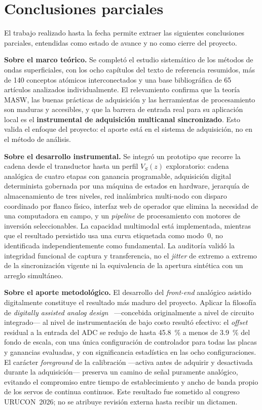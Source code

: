 \section{Conclusiones parciales}
\label{sec:conclusiones}

El trabajo realizado hasta la fecha permite extraer las siguientes conclusiones
parciales, entendidas como estado de avance y no como cierre del proyecto.

\textbf{Sobre el marco te\'orico.} Se complet\'o el estudio sistem\'atico de los m\'etodos de
ondas superficiales, con los ocho cap\'itulos del texto de referencia resumidos, m\'as de
140 conceptos at\'omicos interconectados y una base bibliogr\'afica de 65 art\'iculos
analizados individualmente. El relevamiento confirma que la teor\'ia MASW, las buenas
pr\'acticas de adquisici\'on y las herramientas de procesamiento son maduras y accesibles,
y que la barrera de entrada real para su aplicaci\'on local es el \textbf{instrumental de
adquisici\'on multicanal sincronizado}. Esto valida el enfoque del proyecto: el aporte
est\'a en el sistema de adquisici\'on, no en el m\'etodo de an\'alisis.

\textbf{Sobre el desarrollo instrumental.} Se integr\'o un prototipo que recorre la cadena
desde el transductor hasta un perfil $V_S(z)$ exploratorio: cadena
anal\'ogica de cuatro etapas con ganancia programable, adquisici\'on digital determinista
gobernada por una m\'aquina de estados en hardware, jerarqu\'ia de almacenamiento de tres
niveles, red inal\'ambrica multi-nodo con disparo coordinado por flanco f\'isico,
interfaz web de operador que elimina la necesidad de una computadora en campo, y un
\emph{pipeline} de procesamiento con motores de inversi\'on seleccionables. La capacidad
multimodal est\'a implementada, mientras que el resultado persistido usa una curva
etiquetada como modo~0, no identificada independientemente como fundamental. La
auditor\'ia valid\'o la integridad funcional de captura y transferencia, no el
\emph{jitter} de extremo a extremo de la sincronizaci\'on vigente ni la equivalencia de la
apertura sint\'etica con un arreglo simult\'aneo.

\textbf{Sobre el aporte metodol\'ogico.} El desarrollo del \emph{front-end} anal\'ogico
asistido digitalmente constituye el resultado m\'as maduro del proyecto. Aplicar la
filosof\'ia de \emph{digitally assisted analog design}~\cite{Murmann2004} ---concebida
originalmente a nivel de circuito integrado--- al nivel de instrumentaci\'on de bajo costo
result\'o efectivo: el \emph{offset} residual a la entrada del ADC se redujo de hasta
\SI{45.8}{\percent} a menos de \SI{3.9}{\percent} del fondo de escala, con una \'unica
configuraci\'on de controlador para todas las placas y ganancias evaluadas, y con
significancia estad\'istica en las ocho configuraciones. El car\'acter \emph{foreground} de
la calibraci\'on ---activa antes de adquirir y desactivada durante la adquisici\'on---
preserva un camino de se\~nal puramente anal\'ogico, evitando el compromiso entre tiempo de
establecimiento y ancho de banda propio de los servos de continua continuos. Este
resultado fue sometido al congreso URUCON~2026; no se atribuye revisi\'on externa hasta
recibir un dictamen.

